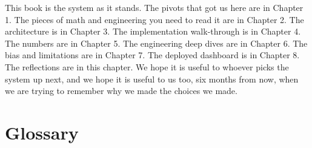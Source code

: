 \documentclass[11pt,letterpaper]{book}
\begin{document}
This book is the system as it stands. The pivots that got us here are in Chapter 1. The pieces of math and engineering you need to read it are in Chapter 2. The architecture is in Chapter 3. The implementation walk-through is in Chapter 4. The numbers are in Chapter 5. The engineering deep dives are in Chapter 6. The bias and limitations are in Chapter 7. The deployed dashboard is in Chapter 8. The reflections are in this chapter. We hope it is useful to whoever picks the system up next, and we hope it is useful to us too, six months from now, when we are trying to remember why we made the choices we made.


\backmatter

\chapter*{Glossary}
\end{document}
